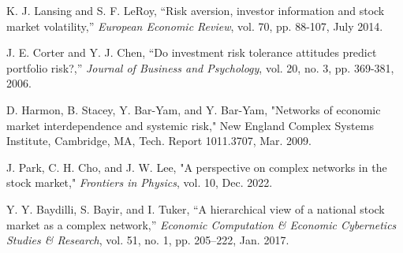 \documentclass[letterpaper, 10 pt, proceedings]{ieeetran}  %
\begin{document}
\begin{thebibliography}{99}
		K. J. Lansing and S. F. LeRoy, “Risk aversion, investor information and stock market volatility,” \textit{European Economic Review}, vol. 70, pp. 88-107, July 2014. 
		
		J. E. Corter and Y. J. Chen, “Do investment risk tolerance attitudes predict portfolio risk?,” \textit{Journal of Business and Psychology}, vol. 20, no. 3, pp. 369-381, 2006.
		
		D. Harmon, B. Stacey, Y. Bar-Yam, and Y. Bar-Yam, "Networks of economic market interdependence and systemic risk," New England Complex Systems Institute, Cambridge, MA, Tech. Report 1011.3707, Mar. 2009.
		
		J. Park, C. H. Cho, and J. W. Lee, "A perspective on complex networks in the stock market," \textit{Frontiers in Physics}, vol. 10, Dec. 2022. %
		
		Y. Y. Baydilli, S. Bayir, and I. Tuker, “A hierarchical view of a national stock market as a complex network,” \textit{Economic Computation \& Economic Cybernetics Studies \& Research}, vol. 51, no. 1, pp. 205–222, Jan. 2017.
		
		
	\end{thebibliography}
	
	
\end{document}

